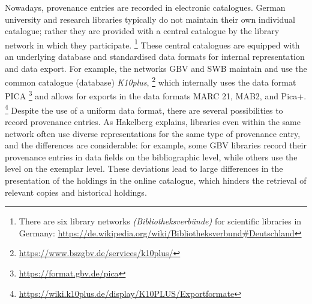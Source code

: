 Nowadays, provenance entries are recorded in electronic catalogues.
German university and research libraries typically do not 
maintain their own individual catalogue; rather they are provided with a central
catalogue by the library network in which they participate.%
\footnote{%
  There are six library networks \emph{(Bibliotheksverbünde)} for scientific libraries
  in Germany: \url{https://de.wikipedia.org/wiki/Bibliotheksverbund\#Deutschland}%
}
These central catalogues are equipped with an underlying database
and standardised data formats for internal representation and data export.
For example, the networks GBV and SWB maintain and use the common catalogue (database)
\emph{K10plus},%
\footnote{\url{https://www.bszgbv.de/services/k10plus/}}
which internally uses the data format PICA%
\footnote{\url{https://format.gbv.de/pica}}
and allows for exports in the data formats
MARC 21, MAB2, and Pica+.%
\footnote{\url{https://wiki.k10plus.de/display/K10PLUS/Exportformate}}
Despite the use of a uniform data format,
there are several possibilities to record provenance entries.
As Hakelberg \autocite*[Chapter~4]{Hakelberg2016} explains,
libraries even within the same network often use diverse representations
for the same type of provenance entry, and the differences are considerable:
for example, some GBV libraries record their provenance entries
in data fields on the bibliographic level,
while others use the level on the exemplar level.
These deviations lead to large differences in the presentation
of the holdings in the online catalogue,
which hinders the retrieval of relevant copies and historical holdings.

